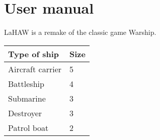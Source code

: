 \chapter{User manual}

LaHAW is a remake of the classic game Warship.

\begin{tabular}{|l|l|}
	\hline
	\bf{Type of ship} 	& \bf{Size} \\
	\hline
	
	Aircraft carrier	& 5 \\
	Battleship 			& 4 \\
	Submarine			& 3 \\
	Destroyer			& 3 \\
	Patrol boat			& 2 \\
	\hline
\end{tabular}